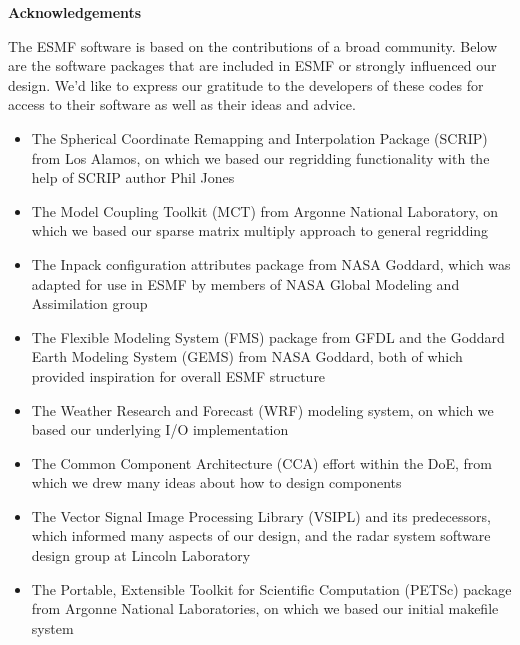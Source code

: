
\vspace{2in}
\begin{center}
{\bf Acknowledgements}
\end{center}

The ESMF software is based on the contributions of a broad community.
Below are the software packages that are included in ESMF or strongly 
influenced our design.  We'd like to express our gratitude to the 
developers of these codes for access to their software as well as their 
ideas and advice.

\begin{itemize}

\item The Spherical Coordinate Remapping and Interpolation Package (SCRIP) 
from Los Alamos, on which we based our regridding functionality with the
help of SCRIP author Phil Jones

\item The Model Coupling Toolkit (MCT) from Argonne National Laboratory,
on which we based our sparse matrix multiply approach to general 
regridding

\item The Inpack configuration attributes package from NASA Goddard, 
which was adapted for use in ESMF by members of NASA Global Modeling and 
Assimilation group

\item The Flexible Modeling System (FMS) package from GFDL and the 
Goddard Earth Modeling System (GEMS) from NASA Goddard, both of which 
provided inspiration for overall ESMF structure

\item The Weather Research and Forecast (WRF) modeling system, on which 
we based our underlying I/O implementation

\item The Common Component Architecture (CCA) effort within the DoE,
from which we drew many ideas about how to design components

\item The Vector Signal Image Processing Library (VSIPL) and its
predecessors, which informed many aspects of our design, and the 
radar system software design group at Lincoln Laboratory

\item The Portable, Extensible Toolkit for Scientific Computation (PETSc) 
package from Argonne National Laboratories, on which we 
based our initial makefile system

\end{itemize}